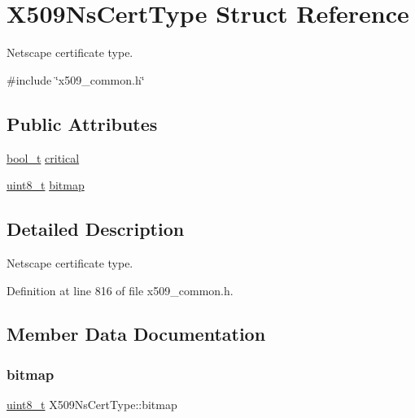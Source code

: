 \hypertarget{structX509NsCertType}{}\section{X509\+Ns\+Cert\+Type Struct Reference}
\label{structX509NsCertType}


Netscape certificate type.  




{\ttfamily \#include \char`\"{}x509\+\_\+common.\+h\char`\"{}}

\subsection*{Public Attributes}
\begin{DoxyCompactItemize}
\item 
\hyperlink{compiler__port_8h_a812d16e5494522586b3784e55d479912}{bool\+\_\+t} \hyperlink{structX509NsCertType_ae633c6008dfd10b8d487d9c4f92eae7b}{critical}
\item 
\hyperlink{stdint_8h_aba7bc1797add20fe3efdf37ced1182c5}{uint8\+\_\+t} \hyperlink{structX509NsCertType_a573466b1c15b14b50697f06c64005917}{bitmap}
\end{DoxyCompactItemize}


\subsection{Detailed Description}
Netscape certificate type. 

Definition at line 816 of file x509\+\_\+common.\+h.



\subsection{Member Data Documentation}
\mbox{\label{structX509NsCertType_a573466b1c15b14b50697f06c64005917}} 
\subsubsection{\texorpdfstring{bitmap}{bitmap}}
{\footnotesize\ttfamily \hyperlink{stdint_8h_aba7bc1797add20fe3efdf37ced1182c5}{uint8\+\_\+t} X509\+Ns\+Cert\+Type\+::bitmap}



